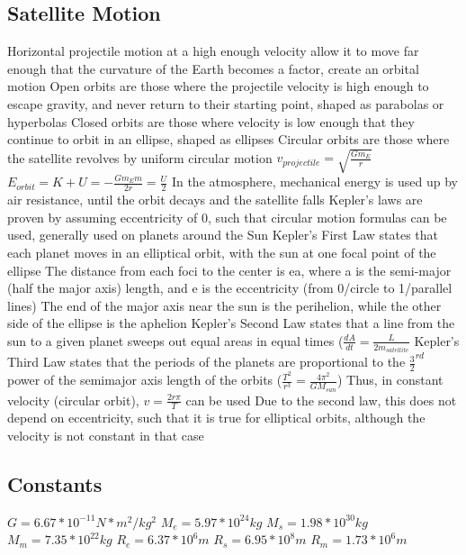 \documentclass[11 pt, twoside]{article}
\newenvironment{outline*}
{
	\begin{outline}[enumerate]
	}
	{\end{outline}
}
\begin{document}
\subsection{Satellite Motion}
\begin{outline*}
\1 Horizontal projectile motion at a high enough velocity allow it to move far enough that the curvature of the Earth becomes a factor, create an orbital motion
\2 Open orbits are those where the projectile velocity is high enough to escape gravity, and never return to their starting point, shaped as parabolas or hyperbolas
\2 Closed orbits are those where velocity is low enough that they continue to orbit in an ellipse, shaped as ellipses
\1 Circular orbits are those where the satellite revolves by uniform circular motion
\2 $v_{projectile} = \sqrt{\frac{Gm_E}{r}}$
\2 $E_{orbit} = K + U = -\frac{Gm_Em}{2r} = \frac{U}{2}$
\2 In the atmosphere, mechanical energy is used up by air resistance, until the orbit decays and the satellite falls
\1 Kepler’s laws are proven by assuming eccentricity of 0, such that circular motion formulas can be used, generally used on planets around the Sun
\1 Kepler’s First Law states that each planet moves in an elliptical orbit, with the sun at one focal point of the ellipse
\2 The distance from each foci to the center is ea, where a is the semi-major (half the major axis) length, and e is the eccentricity (from 0/circle to 1/parallel lines)
\2 The end of the major axis near the sun is the perihelion, while the other side of the ellipse is the aphelion
\1 Kepler’s Second Law states that a line from the sun to a given planet sweeps out equal areas in equal times ($\frac{dA}{dt} = \frac{L}{2m_{satellite}}$ 
\1 Kepler’s Third Law states that the periods of the planets are proportional to the $\frac{3}{2}^{rd}$ power of the semimajor axis length of the orbits ($\frac{T^2}{r^3} = \frac{4\pi^2}{GM_{sun}}$)
\2 Thus, in constant velocity (circular orbit), $v = \frac{2r\pi}{T}$ can be used
\2 Due to the second law, this does not depend on eccentricity, such that it is true for elliptical orbits, although the velocity is not constant in that case
\end{outline*}
\subsection{Constants}
\begin{outline*}
\1 $G = 6.67 * 10^{-11} N*m^2/kg^2$
\1 $M_e = 5.97 * 10^{24} kg$
\1 $M_s = 1.98 * 10^{30} kg$
\1 $M_m = 7.35 * 10^{22} kg$
\1 $R_e = 6.37 * 10^6 m$
\1 $R_s = 6.95 * 10^8 m$
\1 $R_m = 1.73 * 10^6 m$
\end{outline*}
\end{document}
